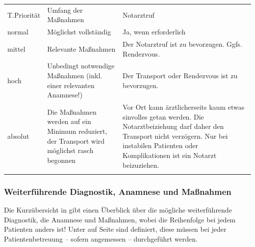 \begin{WidePar}

\begin{tabulary}{\linewidth}{lLL}
\toprule\addlinespace
T.Priorität
&
Umfang der Maßnahmen
&
Notarztruf
\\\addlinespace\midrule\addlinespace
normal 
&
Möglichst vollständig
&
Ja, wenn erforderlich
\\\addlinespace
mittel
&
Relevante Maßnahmen
&
Der Notarztruf ist zu
bevorzugen. Ggfs. Rendezvous.
\\\addlinespace
hoch
&
Unbedingt notwendige Maßnahmen (inkl. einer relevanten
Anamnese!) 
&
Der Transport oder
Rendezvous ist zu bevorzugen.
\\\addlinespace
absolut
&
Die Maßnahmen werden auf ein Minimum reduziert, der
Transport wird möglichst rasch begonnen
&
Vor Ort kann ärztlicherseits kaum etwas sinvolles getan
werden. Die Notarztbeiziehung darf daher den Transport nicht
verzögern. Nur bei instabilen Patienten oder Komplikationen 
ist ein Notarzt beizuziehen. 
\\\addlinespace\bottomrule
\end{tabulary}

\end{WidePar}


\clearpage %
\subsubsection{Weiterführende Diagnostik, Anamnese und
Maßnahmen}


Die Kurzübersicht in 
 gibt einen
Überblick über die mögliche weiterführende Diagnostik, die
Anamnese und Maßnahmen, wobei die
Reihenfolge bei jedem Patienten anders ist!
Unter  auf Seite
\pageref{m:standardmassnahmen-immer} sind  definiert, diese 
müssen bei jeder Patientenbetreuung -- sofern angemessen --
durchgeführt werden.




